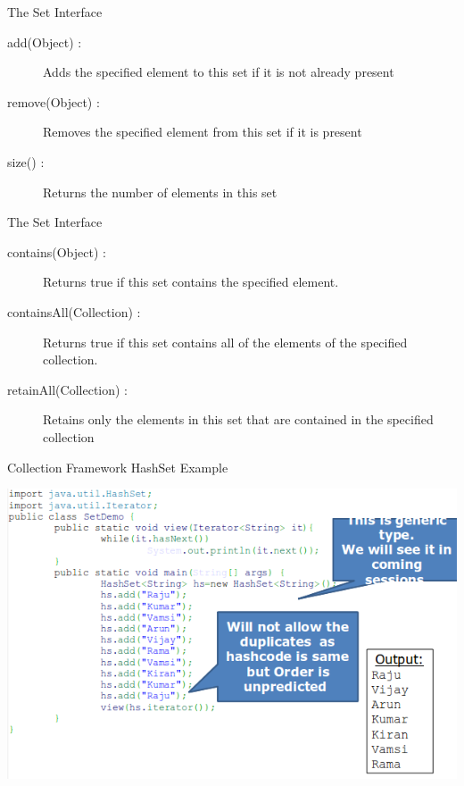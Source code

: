 \documentclass[14pt]{beamer}
\begin{document}
\begin{frame}{The Set Interface}
\begin{description}
\item [add(Object) :] Adds the specified element to this set if it is not already present 
\item [remove(Object) :] Removes the specified element from this set if it is present
\item [size() :] Returns the number of elements in this set 
\end{description}
\end{frame}
\begin{frame}{The Set Interface}
\begin{description}
\item [contains(Object) :] Returns true if this set contains the specified element.
\item [containsAll(Collection) :] Returns true if this set contains all of the elements of the specified collection.
\item [retainAll(Collection) :] Retains only the elements in this set that are contained in the specified collection 
\end{description}
\end{frame}
\begin{frame}{Collection Framework}
HashSet Example
\begin{center}
    \includegraphics[scale=0.5]{COJ-M04-S01-Image2.png}
  \end{center}
\end{frame}
\end{document}

